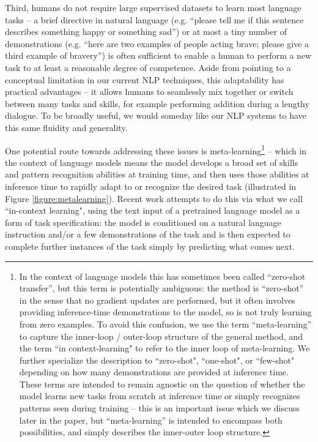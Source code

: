 Third, humans do not require large supervised datasets to learn most language tasks -- a brief directive in natural language (e.g. ``please tell me if this sentence describes something happy or something sad'') or at most a tiny number of demonstrations (e.g. ``here are two examples of people acting brave; please give a third example of bravery'') is often sufficient to enable a human to perform a new task to at least a reasonable degree of competence.  Aside from pointing to a conceptual limitation in our current NLP techniques, this adaptability has practical advantages -- it allows humans to seamlessly mix together or switch between many tasks and skills, for example performing addition during a lengthy dialogue.  To be broadly useful, we would someday like our NLP systems to have this same fluidity and generality.

One potential route towards addressing these issues is meta-learning\footnote{In the context of language models this has sometimes been called ``zero-shot transfer'', but this term is potentially ambiguous: the method is ``zero-shot'' in the sense that no gradient updates are performed, but it often involves providing inference-time demonstrations to the model, so is not truly learning from zero examples.  To avoid this confusion, we use the term ``meta-learning'' to capture the inner-loop / outer-loop structure of the general method, and the term ``in context-learning" to refer to the inner loop of meta-learning. We further specialize the description to ``zero-shot", ``one-shot", or ``few-shot" depending on how many demonstrations are provided at inference time.  These terms are intended to remain agnostic on the question of whether the model learns new tasks from scratch at inference time or simply recognizes patterns seen during training -- this is an important issue which we discuss later in the paper, but ``meta-learning'' is intended to encompass both possibilities, and simply describes the inner-outer loop structure.} -- which in the context of language models means the model develops a broad set of skills and pattern recognition abilities at training time, and then uses those abilities at inference time to rapidly adapt to or recognize the desired task (illustrated in Figure \ref{figure:metalearning}). Recent work \cite{radford2019language} attempts to do this via what we call ``in-context learning", using the text input of a pretrained language model as a form of task specification: the model is conditioned on a natural language instruction and/or a few demonstrations of the task and is then expected to complete further instances of the task simply by predicting what comes next.


